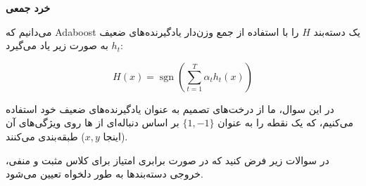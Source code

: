 \textbf{خرد جمعی}

می‌دانیم که Adaboost یک دسته‌بند \(H\) را با استفاده از جمع وزن‌دار یادگیرنده‌های ضعیف \(h_t\) به صورت زیر یاد می‌گیرد:

\begin{latin}
    
\[
H(x) = \operatorname{sgn} \left( \sum_{t=1}^T \alpha_t h_t(x) \right)
\]
\end{latin}


در این سوال، ما از درخت‌های تصمیم به عنوان یادگیرنده‌های ضعیف خود استفاده می‌کنیم، که یک نقطه را به عنوان \(\{1, -1\}\) بر اساس دنباله‌ای از ها روی ویژگی‌های آن (اینجا \(x, y\)) طبقه‌بندی می‌کنند.

در سوالات زیر فرض کنید 
 که در صورت برابری امتیاز برای کلاس مثبت و منفی، خروجی دسته‌بندها به طور دلخواه تعیین می‌شود.
\vspace{-5mm}
